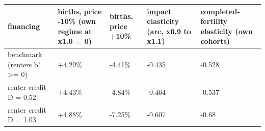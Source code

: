 \begingroup\small
\setlength{\tabcolsep}{3pt}
\renewcommand{\arraystretch}{1.04}
\begin{tabularx}{\linewidth}{XXXXX}
\toprule
financing & births, price -10\% (own regime at x1.0 = 0) & births, price +10\% & impact elasticity (arc, x0.9 to x1.1) & completed-fertility elasticity (own cohorts) \\
\midrule
benchmark (renters b' \textgreater{}= 0) & +4.29\% & -4.41\% & -0.435 & -0.528 \\
renter credit D = 0.52 & +4.43\% & -4.84\% & -0.464 & -0.537 \\
renter credit D = 1.03 & +4.88\% & -7.25\% & -0.607 & -0.68 \\
\bottomrule
\end{tabularx}
\endgroup
